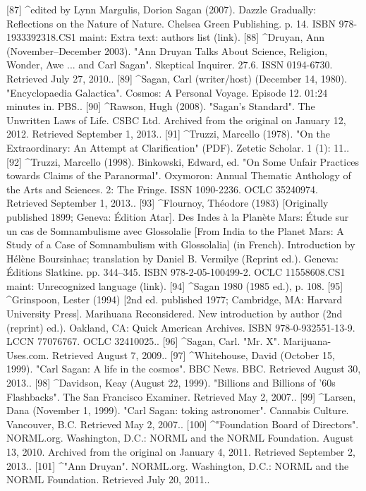 [87]
^edited by Lynn Margulis, Dorion Sagan (2007). Dazzle Gradually: Reflections on the Nature of Nature. Chelsea Green Publishing. p. 14. ISBN 978-1933392318.CS1 maint: Extra text: authors list (link).
[88]
^Druyan, Ann (November–December 2003). "Ann Druyan Talks About Science, Religion, Wonder, Awe ... and Carl Sagan". Skeptical Inquirer. 27.6. ISSN 0194-6730. Retrieved July 27, 2010..
[89]
^Sagan, Carl (writer/host) (December 14, 1980). "Encyclopaedia Galactica". Cosmos: A Personal Voyage. Episode 12. 01:24 minutes in. PBS..
[90]
^Rawson, Hugh (2008). "Sagan's Standard". The Unwritten Laws of Life. CSBC Ltd. Archived from the original on January 12, 2012. Retrieved September 1, 2013..
[91]
^Truzzi, Marcello (1978). "On the Extraordinary: An Attempt at Clarification" (PDF). Zetetic Scholar. 1 (1): 11..
[92]
^Truzzi, Marcello (1998). Binkowski, Edward, ed. "On Some Unfair Practices towards Claims of the Paranormal". Oxymoron: Annual Thematic Anthology of the Arts and Sciences. 2: The Fringe. ISSN 1090-2236. OCLC 35240974. Retrieved September 1, 2013..
[93]
^Flournoy, Théodore (1983) [Originally published 1899; Geneva: Édition Atar]. Des Indes à la Planète Mars: Étude sur un cas de Somnambulisme avec Glossolalie [From India to the Planet Mars: A Study of a Case of Somnambulism with Glossolalia] (in French). Introduction by Hélène Boursinhac; translation by Daniel B. Vermilye (Reprint ed.). Geneva: Éditions Slatkine. pp. 344–345. ISBN 978-2-05-100499-2. OCLC 11558608.CS1 maint: Unrecognized language (link).
[94]
^Sagan 1980 (1985 ed.), p. 108.
[95]
^Grinspoon, Lester (1994) [2nd ed. published 1977; Cambridge, MA: Harvard University Press]. Marihuana Reconsidered. New introduction by author (2nd (reprint) ed.). Oakland, CA: Quick American Archives. ISBN 978-0-932551-13-9. LCCN 77076767. OCLC 32410025..
[96]
^Sagan, Carl. "Mr. X". Marijuana-Uses.com. Retrieved August 7, 2009..
[97]
^Whitehouse, David (October 15, 1999). "Carl Sagan: A life in the cosmos". BBC News. BBC. Retrieved August 30, 2013..
[98]
^Davidson, Keay (August 22, 1999). "Billions and Billions of '60s Flashbacks". The San Francisco Examiner. Retrieved May 2, 2007..
[99]
^Larsen, Dana (November 1, 1999). "Carl Sagan: toking astronomer". Cannabis Culture. Vancouver, B.C. Retrieved May 2, 2007..
[100]
^"Foundation Board of Directors". NORML.org. Washington, D.C.: NORML and the NORML Foundation. August 13, 2010. Archived from the original on January 4, 2011. Retrieved September 2, 2013..
[101]
^"Ann Druyan". NORML.org. Washington, D.C.: NORML and the NORML Foundation. Retrieved July 20, 2011..
